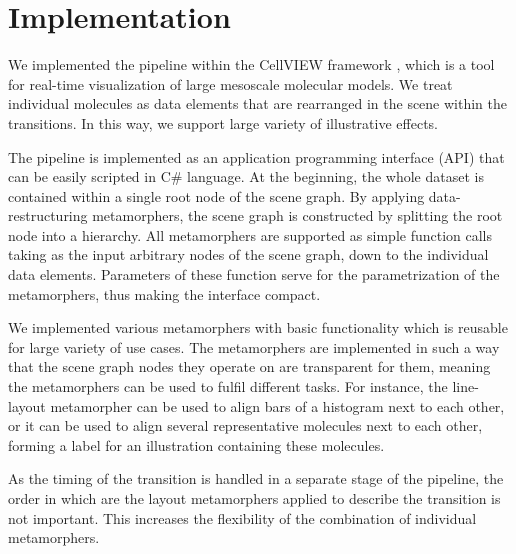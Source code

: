\section{Implementation}

We implemented the pipeline within the CellVIEW framework \cite{muzic15}, which is a tool for real-time visualization of large mesoscale molecular models. We treat individual molecules as data elements that are rearranged in the scene within the transitions. In this way, we support large variety of illustrative effects.

The pipeline is implemented as an application programming interface (API) that can be easily scripted in C\# language. At the beginning, the whole dataset is contained within a single root node of the scene graph. By applying data-restructuring metamorphers, the scene graph is constructed by splitting the root node into a hierarchy. All metamorphers are supported as simple function calls taking as the input arbitrary nodes of the scene graph, down to the individual data elements. Parameters of these function serve for the parametrization of the metamorphers, thus making the interface compact.

We implemented various metamorphers with basic functionality which is reusable for large variety of use cases. The metamorphers are implemented in such a way that the scene graph nodes they operate on are transparent for them, meaning the metamorphers can be used to fulfil different tasks. For instance, the line-layout metamorpher can be used to align bars of a histogram next to each other, or it can be used to align several representative molecules next to each other, forming a label for an illustration containing these molecules.

As the timing of the transition is handled in a separate stage of the pipeline, the order in which are the layout metamorphers applied to describe the transition is not important. This increases the flexibility of the combination of individual metamorphers.



